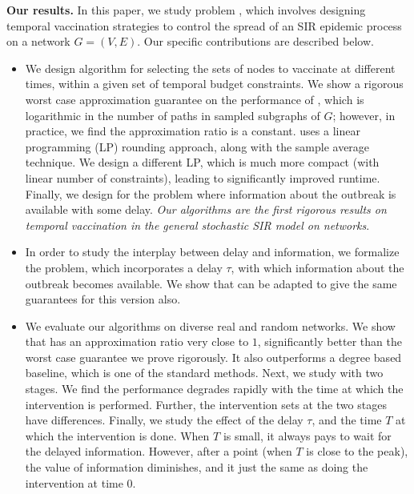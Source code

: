 \noindent
\textbf{Our results.}
In this paper, we study problem \prob{}, which involves designing temporal vaccination strategies to control
the spread of an SIR epidemic process on a network $G=(V, E)$.
Our specific contributions are described below.
\begin{itemize}
\item
We design algorithm \algo{} for selecting the sets of nodes to vaccinate at different times,
within a given set of temporal budget constraints. We show a rigorous worst case approximation guarantee on
the performance of \algo{}, which is logarithmic in the number of paths in sampled subgraphs of $G$;
however, in practice, we find the approximation ratio is a constant.
\algo{} uses a linear programming (LP) rounding approach, along with the sample average technique. 
We design a different LP, which is much more compact (with linear number of constraints), leading to 
significantly improved runtime. Finally, we design \algodelay{} for the problem where information about the outbreak is available with some delay.
\emph{Our algorithms are the first rigorous results on temporal vaccination in the general
stochastic SIR model on networks}.
\item
In order to study the interplay between delay and information, we formalize the \probdelay{} problem, which incorporates a delay $\tau$, with which information about the outbreak becomes available.
We show that \algo{} can be adapted to give the same guarantees for this version also.
\item 
We evaluate our algorithms on diverse real and random networks.
We show that \algo{} has an approximation ratio very close to $1$, significantly better than the worst case guarantee we prove rigorously. It also outperforms a degree based baseline, which is one of the standard methods. Next, we study \prob{} with two stages. We find the performance degrades rapidly with the time at which the intervention is performed. Further, the intervention sets at the two stages have differences.
Finally, we study the effect of the delay $\tau$, and the time $T$ at which the intervention is done. When $T$ is small, it always pays to wait for the delayed information. However, after a point (when $T$ is close to the peak), the value of information diminishes, and it just the same as doing the intervention at time $0$.
\end{itemize}

